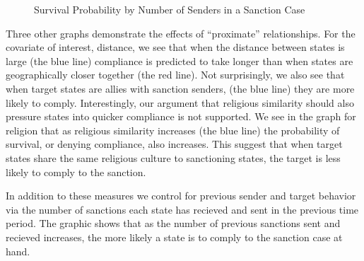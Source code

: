 \begin{figure}[ht]
	\centering
	\caption{Survival Probability by Number of Senders in a Sanction Case}
	\resizebox{1\textwidth}{!}{}
	\label{fig:surv1}
\end{figure}

Three other graphs demonstrate the effects of ``proximate'' relationships. For the covariate of interest, distance, we see that when the distance between states is large (the blue line) compliance is predicted to take longer than when states are geographically closer together (the red line). Not surprisingly, we also see that when target states are allies with sanction senders, (the blue line) they are more likely to comply. Interestingly, our argument that religious similarity should also pressure states into quicker compliance is not supported. We see in the graph for religion that as religious similarity increases (the blue line) the probability of survival, or denying compliance, also increases. This suggest that when target states share the same religious culture to sanctioning states, the target is less likely to comply to the sanction.

In addition to these measures we control for previous sender and target behavior via the number of sanctions each state has recieved and sent in the previous time period. The graphic shows that as the number of previous sanctions sent and recieved increases, the more likely a state is to comply to the sanction case at hand. 





\begin{figure}[ht]
	\centering
	\resizebox{1\textwidth}{!}{}	
\end{figure}

\begin{figure}[ht]
	\centering
	\resizebox{1\textwidth}{!}{}	
\end{figure}

